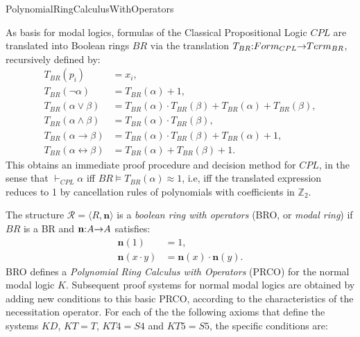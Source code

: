 \begin{entry}{PolynomialRingCalculusWithOperators}  

\newcommand{\fn}[3]{#1\negthickspace : \negthickspace #2 \negthickspace\to\negthickspace #3}
\def\n{\textbf{n}}
\newcommand{\vdashp}{\vdash_{\approx}}

\begin{calculus} 
 
 As  basis  for modal logics, formulas of   the  Classical Propositional Logic $CPL$ are translated into  Boolean rings   $BR$   via  the translation $\fn{T_{BR}}{Form_{CPL}}{Term_{BR}}$, recursively defined by:
\begin{align*}   
	T_{BR}(p_i) &= x_i,\\
	T_{BR}(\neg \alpha) &= T_{BR}(\alpha) + 1,\\
	T_{BR}(\alpha \vee \beta) &= T_{BR}(\alpha) \cdot T_{BR}(\beta) + T_{BR}(\alpha) + T_{BR}(\beta),\\
	T_{BR}(\alpha \wedge \beta) &= T_{BR}(\alpha) \cdot T_{BR}(\beta),\\
	T_{BR}(\alpha \to \beta) &= T_{BR}(\alpha) \cdot T_{BR}(\beta) + T_{BR}(\alpha) + 1,\\
	T_{BR}(\alpha \leftrightarrow \beta) &= T_{BR}(\alpha) + T_{BR}(\beta) + 1. 
\end{align*}
This obtains an  immediate  proof  procedure and decision  method for $CPL$, in the sense that
 $\vdash_{CPL} \alpha$ iff  $BR \vDash T_{BR}(\alpha) \approx 1$,
i.e, iff the translated expression reduces to 1 by cancellation rules of  polynomials with  coefficients
in $\mathbb{Z}_{2}$.
 
 The  structure   $\mathcal{R}=\langle R,  \n \rangle$ is a \emph{boolean ring with operators} (BRO, or \emph{modal ring})  if $BR$ is a BR and $\fn{\n}{A}{A}$ satisfies:
	\begin{align*}
		\n(1) &= 1,\\
		\n(x \cdot y) &= \n(x) \cdot \n(y).
	\end{align*}
BRO defines a   \emph{Polynomial Ring Calculus with Operators} (PRCO) for the  normal modal  logic   $K$. Subsequent  proof  systems for  normal modal logics are obtained by adding  new conditions to this basic PRCO, according to the characteristics of the   necessitation operator. For each of the  the following axioms that   define the systems $KD$, $KT= T$, $KT4 = S4$ and $KT5= S5$,  the specific  conditions are:



\end{calculus}
\end{entry}
